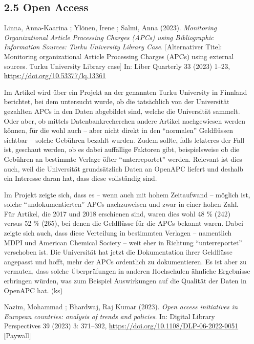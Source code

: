 \documentclass[a4paper,
fontsize=11pt,
oneside,
numbers=noperiodatend,
parskip=half-,
bibliography=totoc,
final
]{scrartcl}
\begin{document}
\hypertarget{open-access}{%
\subsection{2.5 Open Access}\label{open-access}}

Linna, Anna-Kaarina ; Ylönen, Irene ; Salmi, Anna (2023).
\emph{Monitoring Organizational Article Processing Charges (APCs) using
Bibliographic Information Sources: Turku University Library Case}.
{[}Alternativer Titel: Monitoring organizational Article Processing
Charges (APCs) using external sources. Turku University Library case{]}
In: Liber Quarterly 33 (2023) 1--23,
\url{https://doi.org/10.53377/lq.13361}

Im Artikel wird über ein Projekt an der genannten Turku University in
Finnland berichtet, bei dem untersucht wurde, ob die tatsächlich von der
Universität gezahlten APCs in den Daten abgebildet sind, welche die
Universität sammelt. Oder aber, ob mittels Datenbankrecherchen andere
Artikel nachgewiesen werden können, für die wohl auch -- aber nicht
direkt in den \enquote{normalen} Geldflüssen sichtbar -- solche Gebühren
bezahlt wurden. Zudem sollte, falls letzteres der Fall ist, geschaut
werden, ob es dabei auffällige Faktoren gibt, beispielsweise ob die
Gebühren an bestimmte Verlage öfter \enquote{unterreportet} werden.
Relevant ist dies auch, weil die Universität grundsätzlich Daten an
OpenAPC liefert und deshalb ein Interesse daran hat, dass diese
vollständig sind.

Im Projekt zeigte sich, dass es -- wenn auch mit hohem Zeitaufwand --
möglich ist, solche \enquote{undokumentierten} APCs nachzuweisen und
zwar in einer hohen Zahl. Für Artikel, die 2017 und 2018 erschienen
sind, waren dies wohl 48 \% (242) versus 52 \% (265), bei denen die
Geldflüsse für die APCs bekannt waren. Dabei zeigte sich auch, dass
diese Verteilung in bestimmten Verlagen -- namentlich MDPI und American
Chemical Society -- weit eher in Richtung \enquote{unterreportet}
verschoben ist. Die Universität hat jetzt die Dokumentation ihrer
Geldflüsse angepasst und hofft, mehr der APCs ordentlich zu
dokumentieren. Es ist aber zu vermuten, dass solche Überprüfungen in
anderen Hochschulen ähnliche Ergebnisse erbringen würden, was zum
Beispiel Auswirkungen auf die Qualität der Daten in OpenAPC hat. (ks)

Nazim, Mohammad ; Bhardwaj, Raj Kumar (2023). \emph{Open access
initiatives in European countries: analysis of trends and policies}. In:
Digital Library Perspectives 39 (2023) 3: 371--392,
\url{https://doi.org/10.1108/DLP-06-2022-0051} {[}Paywall{]}
\end{document}

